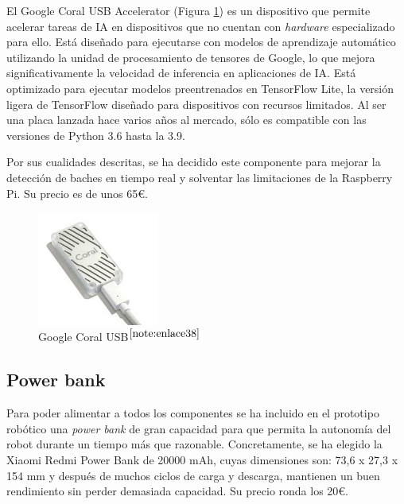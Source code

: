 El Google Coral USB Accelerator (Figura \ref{fig:googlecoral}) es un dispositivo que permite acelerar tareas de \ac{IA} en dispositivos que no cuentan con \textit{hardware} especializado para ello. Está diseñado para ejecutarse con modelos de aprendizaje automático utilizando la unidad de procesamiento de tensores de Google, lo que mejora significativamente la velocidad de inferencia en aplicaciones de \acs{IA}. Está optimizado para ejecutar modelos preentrenados en TensorFlow Lite, la versión ligera de TensorFlow diseñado para dispositivos con recursos limitados. Al ser una placa lanzada hace varios años al mercado, sólo es compatible con  las versiones de Python 3.6 hasta la 3.9.

Por sus cualidades descritas, se ha decidido este componente para mejorar la detección de baches en tiempo real y solventar las limitaciones de la Raspberry Pi. Su precio es de unos 65€.
 
\begin{figure} [h!]
	\begin{center}
		\includegraphics[width=4cm]{figs/googlecoral.png}
	\end{center}
	\caption{Google Coral USB$^{\ref{note:enlace38}}$} 
	\label{fig:googlecoral}
\end{figure}

\setcounter{footnote}{38} %

\subsection{Power bank}
\label{subsec:powerbank}

Para poder alimentar a todos los componentes se ha incluido en el prototipo robótico una \textit{power bank} de gran capacidad para que permita la autonomía del robot durante un tiempo más que razonable. Concretamente, se ha elegido la Xiaomi Redmi Power Bank de 20000 mAh, cuyas dimensiones son: 73,6 x 27,3 x 154 mm y después de muchos ciclos de carga y descarga, mantienen un buen rendimiento sin perder demasiada capacidad. Su precio ronda los 20€. %

